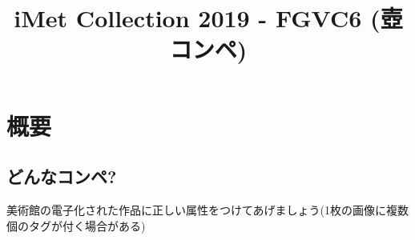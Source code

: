 \documentclass{jsarticle}
\begin{document}
\title{iMet Collection 2019 - FGVC6 (壺コンペ)}
\author{}
\date{}
\maketitle

\section{概要}
\subsection{どんなコンペ?}
美術館の電子化された作品に正しい属性をつけてあげましょう(1枚の画像に複数個のタグが付く場合がある)
\end{document}
